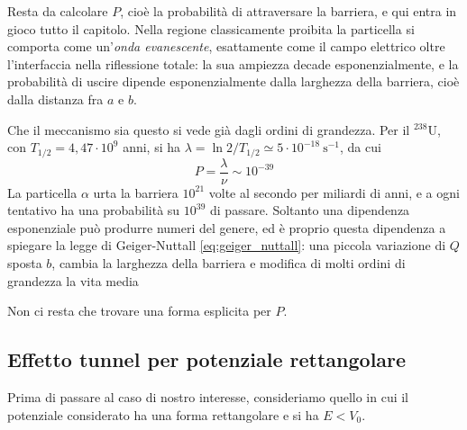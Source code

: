 Resta da calcolare $P$, cioè la probabilità di attraversare la barriera, e qui entra in gioco tutto il capitolo. Nella regione classicamente proibita la particella si comporta come un'\emph{onda evanescente}, esattamente come il campo elettrico oltre l'interfaccia nella riflessione totale: la sua ampiezza decade esponenzialmente, e la probabilità di uscire dipende esponenzialmente dalla larghezza della barriera, cioè dalla distanza fra $a$ e $b$.

Che il meccanismo sia questo si vede già dagli ordini di grandezza. Per il $^{238}\mathrm{U}$, con $T_{1/2} = 4,47 \cdot 10^9$ anni, si ha $\lambda = \ln 2 / T_{1/2} \simeq 5 \cdot 10^{-18} \ \mathrm{s}^{-1}$, da cui
%
\begin{equation*}
    P = \frac{\lambda}{\nu} \sim 10^{-39}
\end{equation*}
La particella $\alpha$ urta la barriera $10^{21}$ volte al secondo per miliardi di anni, e a ogni tentativo ha una probabilità su $10^{39}$ di passare. Soltanto una dipendenza esponenziale può produrre numeri del genere, ed è proprio questa dipendenza a spiegare la legge di Geiger-Nuttall \eqref{eq:geiger_nuttall}: una piccola variazione di $Q$ sposta $b$, cambia la larghezza della barriera e modifica di molti ordini di grandezza la vita media

Non ci resta che trovare una forma esplicita per $P$.

\subsection*{Effetto tunnel per potenziale rettangolare}

Prima di passare al caso di nostro interesse, consideriamo quello in cui il potenziale considerato ha una forma rettangolare e si ha $E < V_0$.

